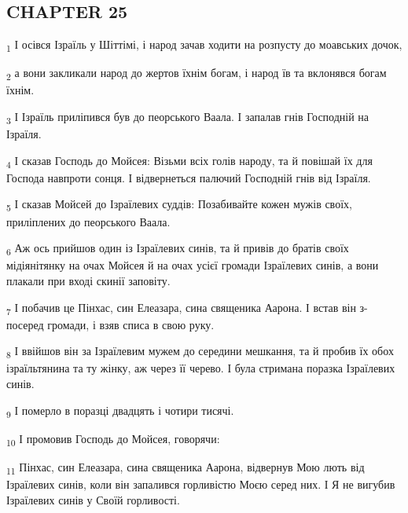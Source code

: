 \subsection{CHAPTER 25}
\begin{tcolorbox}
\textsubscript{1} І осівся Ізраїль у Шіттімі, і народ зачав ходити на розпусту до моавських дочок,
\end{tcolorbox}
\begin{tcolorbox}
\textsubscript{2} а вони закликали народ до жертов їхнім богам, і народ їв та вклонявся богам їхнім.
\end{tcolorbox}
\begin{tcolorbox}
\textsubscript{3} І Ізраїль приліпився був до пеорського Ваала. І запалав гнів Господній на Ізраїля.
\end{tcolorbox}
\begin{tcolorbox}
\textsubscript{4} І сказав Господь до Мойсея: Візьми всіх голів народу, та й повішай їх для Господа навпроти сонця. І відвернеться палючий Господній гнів від Ізраїля.
\end{tcolorbox}
\begin{tcolorbox}
\textsubscript{5} І сказав Мойсей до Ізраїлевих суддів: Позабивайте кожен мужів своїх, приліплених до пеорського Ваала.
\end{tcolorbox}
\begin{tcolorbox}
\textsubscript{6} Аж ось прийшов один із Ізраїлевих синів, та й привів до братів своїх мідіянітянку на очах Мойсея й на очах усієї громади Ізраїлевих синів, а вони плакали при вході скинії заповіту.
\end{tcolorbox}
\begin{tcolorbox}
\textsubscript{7} І побачив це Пінхас, син Елеазара, сина священика Аарона. І встав він з-посеред громади, і взяв списа в свою руку.
\end{tcolorbox}
\begin{tcolorbox}
\textsubscript{8} І ввійшов він за Ізраїлевим мужем до середини мешкання, та й пробив їх обох ізраїльтянина та ту жінку, аж через її черево. І була стримана поразка Ізраїлевих синів.
\end{tcolorbox}
\begin{tcolorbox}
\textsubscript{9} І померло в поразці двадцять і чотири тисячі.
\end{tcolorbox}
\begin{tcolorbox}
\textsubscript{10} І промовив Господь до Мойсея, говорячи:
\end{tcolorbox}
\begin{tcolorbox}
\textsubscript{11} Пінхас, син Елеазара, сина священика Аарона, відвернув Мою лють від Ізраїлевих синів, коли він запалився горливістю Моєю серед них. І Я не вигубив Ізраїлевих синів у Своїй горливості.
\end{tcolorbox}
